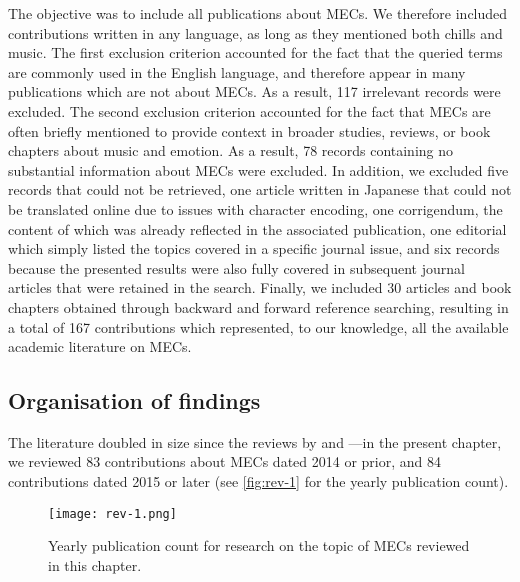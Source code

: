 The objective was to include all publications about MECs. We therefore included contributions written in any language, as long as they mentioned both chills and music. The first exclusion criterion accounted for the fact that the queried terms are commonly used in the English language, and therefore appear in many publications which are not about MECs. As a result, 117 irrelevant records were excluded. The second exclusion criterion accounted for the fact that MECs are often briefly mentioned to provide context in broader studies, reviews, or book chapters about music and emotion. As a result, 78 records containing no substantial information about MECs were excluded. In addition, we excluded five records that could not be retrieved, one article written in Japanese that could not be translated online due to issues with character encoding, one corrigendum, the content of which was already reflected in the associated publication, one editorial which simply listed the topics covered in a specific journal issue, and six records because the presented results were also fully covered in subsequent journal articles that were retained in the search. Finally, we included 30 articles and book chapters obtained through backward and forward reference searching, resulting in a total of 167 contributions which represented, to our knowledge, all the available academic literature on MECs.

\subsection{Organisation of findings}

The literature doubled in size since the reviews by \textcite{harrison2014} and \textcite{mori2014a}---in the present chapter, we reviewed 83 contributions about MECs dated 2014 or prior, and 84 contributions dated 2015 or later (see \autoref{fig:rev-1} for the yearly publication count).

\begin{figure}[t!]
\texttt{[image: rev-1.png]}
\centering
\caption{Yearly publication count for research on the topic of MECs reviewed in this chapter.}
\label{fig:rev-1}
\end{figure}

